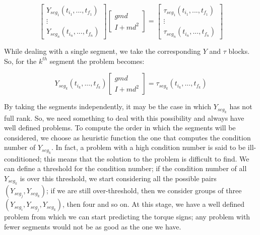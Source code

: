 \documentclass{article}
\begin{document}
\vspace{1em}
\[\begin{bmatrix}
Y_{seg_1}(t_{i_1}, ..., t_{f_1})\\
\vdots \\
Y_{seg_n}(t_{i_n}, ..., t_{f_n})
\end{bmatrix} \begin{bmatrix}
gmd \\ I +md^2
\end{bmatrix} = \begin{bmatrix}
\tau_{seg_1}(t_{i_1}, ..., t_{f_1})\\
\vdots \\
\tau_{seg_n}(t_{i_n}, ..., t_{f_n})
\end{bmatrix} \]
\vspace{1em}

While dealing with a single segment, we take the corresponding $Y$ and $\tau$  blocks. So, for the $k^{th}$ segment the problem becomes:

\[Y_{seg_k}(t_{i_k}, ..., t_{f_k})
\begin{bmatrix}
gmd \\ I +md^2
\end{bmatrix} =
\tau_{seg_k}(t_{i_k}, ..., t_{f_k})\]

By taking the segments independently, it may be the case in which $Y_{seg_k}$ has not full rank. So, we need something to deal with this possibility and always have well defined problems. To compute the order in which the segments will be considered, we choose as heuristic function  the one that computes the condition number of $Y_{seg_k}$. In fact, a problem with a high condition number is said to be ill-conditioned; this means that the solution to the problem is difficult to find. We can define a threshold for the condition number; if the condition number of all $Y_{seg_k}$ is over this threshold, we start considering all the possible pairs $(Y_{seg_j},Y_{seg_k})$; if we are still over-threshold, then we consider groups of three $(Y_{seg_i},Y_{seg_j},Y_{seg_k})$, then four and so on. At this stage, we have a well defined problem from which we can start predicting the torque signs; any problem with fewer segments would not be as good as the one we have.
\end{document}
